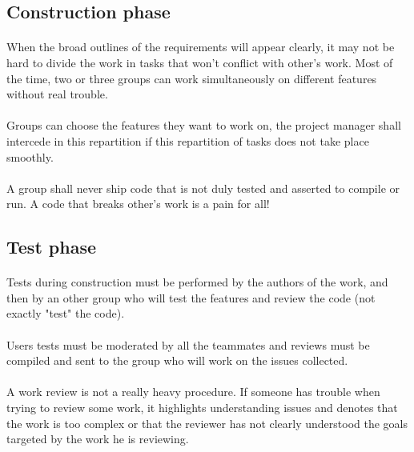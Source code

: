 \subsection{Construction phase}

\paragraph{} When the broad outlines of the requirements will appear clearly,
it may not be hard to divide the work in tasks that won't conflict with other's
work. Most of the time, two or three groups can work simultaneously on different
features without real trouble.

\paragraph{} Groups can choose the features they want to work on, the project
manager shall intercede in this repartition if this repartition of tasks does
not take place smoothly.

\paragraph{} A group shall never ship code that is not duly tested and asserted
to compile or run. A code that breaks other's work is a pain for all!

\subsection{Test phase}

\paragraph{} Tests during construction must be performed by the authors of the
work, and then by an other group who will test the features and review the code
(not exactly "test" the code).

\paragraph{} Users tests must be moderated by all the teammates and reviews must
be compiled and sent to the group who will work on the issues collected.

\paragraph{} A work review is not a really heavy procedure. If someone has
trouble when trying to review some work, it highlights understanding issues and
denotes that the work is too complex or that the reviewer has not clearly
understood the goals targeted by the work he is reviewing.

